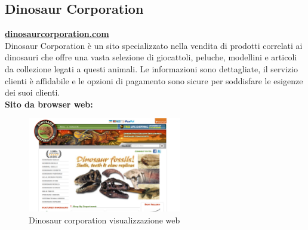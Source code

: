 \subsection{Dinosaur Corporation}
\href{https://www.dinosaurcorporation.com/}{\textbf{dinosaurcorporation.com}}
\\Dinosaur Corporation è un sito specializzato nella vendita di prodotti correlati ai dinosauri che offre una vasta selezione di giocattoli, peluche, modellini e articoli da collezione legati a questi animali. Le informazioni sono dettagliate, il servizio clienti è affidabile e le opzioni di pagamento sono sicure per soddisfare le esigenze dei suoi clienti. 
\\
\textbf{Sito da browser web:}
\begin{figure}[H]
        \centering
        \includegraphics[width=0.60\textwidth]{immagini/dinosaurcorporation.png}
        \caption{Dinosaur corporation visualizzazione web}
    \end{figure}

